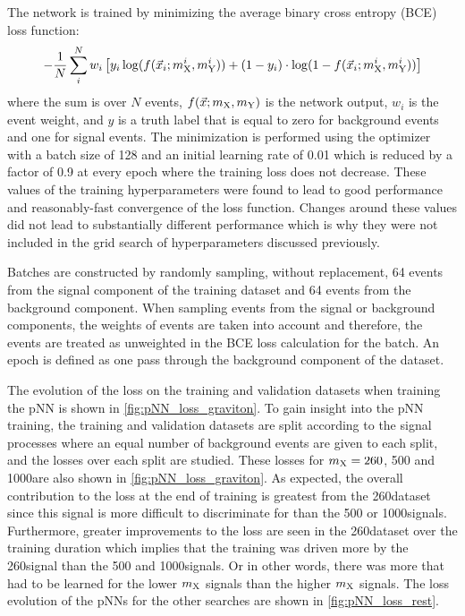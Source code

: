 The network is trained by minimizing the average binary cross entropy (BCE) loss function:
\begin{equation}
    -\frac{1}{N} \sum_i^N w_i \left[ y_i \log(f(\vec{x}_i; m_{\mathrm{X}}^i, m_{\mathrm{Y}}^i)) + (1-y_i)\cdot\log(1-f(\vec{x}_i; m_{\mathrm{X}}^i, m_{\mathrm{Y}}^i)) \right]
\end{equation}
where the sum is over $N$ events, $f(\vec{x};m_{\mathrm{X}}, m_{\mathrm{Y}})$ is the network output, $w_i$ is the event weight, and $y$ is a truth label that is equal to zero for background events and one for signal events. The minimization is performed using the \ADAM optimizer~\cite{Adam} with a batch size of 128 and an initial learning rate of 0.01 which is reduced by a factor of 0.9 at every epoch where the training loss does not decrease. These values of the training hyperparameters were found to lead to good performance and reasonably-fast convergence of the loss function. Changes around these values did not lead to substantially different performance which is why they were not included in the grid search of hyperparameters discussed previously. 

Batches are constructed by randomly sampling, without replacement, 64 events from the signal component of the training dataset and 64 events from the background component. When sampling events from the signal or background components, the weights of events are taken into account and therefore, the events are treated as unweighted in the BCE loss calculation for the batch. An epoch is defined as one pass through the background component of the dataset. 

The evolution of the loss on the training and validation datasets when training the \XTwoHH pNN is shown in \cref{fig:pNN_loss_graviton}. To gain insight into the pNN training, the training and validation datasets are split according to the signal processes where an equal number of background events are given to each split, and the losses over each split are studied. These losses for $m_{\mathrm{X}} = 260$, 500 and 1000\GeV are also shown in \cref{fig:pNN_loss_graviton}. As expected, the overall contribution to the loss at the end of training is greatest from the 260\GeV dataset since this signal is more difficult to discriminate for than the 500 or 1000\GeV signals. Furthermore, greater improvements to the loss are seen in the 260\GeV dataset over the training duration which implies that the training was driven more by the 260\GeV signal than the 500 and 1000\GeV signals. Or in other words, there was more that had to be learned for the lower $m_{\mathrm{X}}$ signals than the higher $m_{\mathrm{X}}$ signals. The loss evolution of the pNNs for the other searches are shown in \cref{fig:pNN_loss_rest}.

